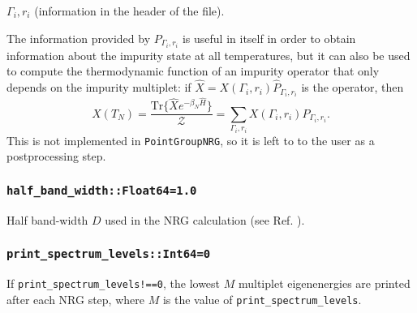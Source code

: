 \documentclass[notitlepage]{article}
\begin{document}
$\Gamma_i,r_i$ (information in the header of the file). 
\par
The information provided by $P_{\Gamma_i,r_i}$ is useful in
itself in order to obtain information about the impurity
state at all temperatures, but it can also be used to
compute the thermodynamic function of an impurity operator 
that only depends on the impurity multiplet: if $\hat
X=X(\Gamma_i,r_i) \hat{P}_{\Gamma_i,r_i}$ is the operator,
then
\begin{equation}
    X(T_N) 
    = 
    \frac{
        \text{Tr}
        \{\hat X e^{-\beta_N\hat H}\}
    }{
        \mathcal Z
    }
    =
    \sum_{\Gamma_i,r_i}
    X(\Gamma_i,r_i)
    P_{\Gamma_i,r_i}.
\end{equation}
This is not implemented in \texttt{PointGroupNRG}, so it is
left to to the user as a postprocessing step.

\subsubsection{\texttt{half\_band\_width::Float64=1.0}}
\label{nrg_bandwidth}
Half band-width $D$ used in the NRG calculation (see
Ref. \cite{krishna-murthy1980a}).

\subsubsection{\texttt{print\_spectrum\_levels::Int64=0}}
If \texttt{print\_spectrum\_levels!==0}, the lowest $M$
multiplet eigenenergies are printed after each NRG step,
where $M$ is the value of \texttt{print\_spectrum\_levels}.
\end{document}
